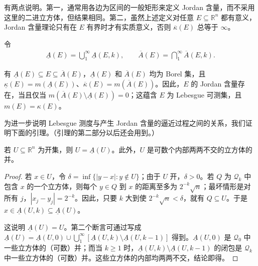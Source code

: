 \documentclass[../../main.tex]{subfiles}%
\begin{document}
\begin{remark}
有两点说明。第一，通常用各边为区间的一般矩形来定义 Jordan 含量，而不采用这里的二进立方体，但结果相同。第二，虽然上述定义对任意 $E\subseteq\mathbb{R}^n$ 都有意义，Jordan 含量理论只有在 $E$ 有界时才有实质意义，否则 $\overline{\kappa}(E)$ 总等于 $\infty$。
\end{remark}
令
\begin{align*}
\underline{A}(E)=\bigcup_1^\infty\underline{A}(E,k),\qquad
\overline{A}(E)=\bigcap_1^\infty\overline{A}(E,k).
\end{align*}
\begin{proposition}\label{proposition:ch02-jordan-lebesgue-criterion}
有 $\underline{A}(E)\subseteq E\subseteq\overline{A}(E)$，$\underline{A}(E)$ 和 $\overline{A}(E)$ 均为 Borel 集，且 $\underline{\kappa}(E)=m(\underline{A}(E))$、$\overline{\kappa}(E)=m(\overline{A}(E))$。因此，$E$ 的 Jordan 含量存在，当且仅当 $m(\overline{A}(E)\setminus\underline{A}(E))=0$；这蕴含 $E$ 为 Lebesgue 可测集，且 $m(E)=\kappa(E)$。
\end{proposition}
为进一步说明 Lebesgue 测度与产生 Jordan 含量的逼近过程之间的关系，我们证明下面的引理。（引理的第二部分以后还会用到。）
\begin{lemma}\label{lemma:ch02-open-cubes}
若 $U\subseteq\mathbb{R}^n$ 为开集，则 $U=\underline{A}(U)$。此外，$U$ 是可数个内部两两不交的立方体的并。
\end{lemma}
\begin{proof}
若 $x\in U$，令 $\delta=\inf\{|y-x|:y\notin U\}$；由于 $U$ 开，$\delta>0$。若 $Q$ 为 $\mathscr{Q}_k$ 中包含 $x$ 的一个立方体，则每个 $y\in Q$ 到 $x$ 的距离至多为 $2^{-k}\sqrt n$；最坏情形是对所有 $j$，$|x_j-y_j|=2^{-k}$。因此，只要 $k$ 大到使 $2^{-k}\sqrt n<\delta$，就有 $Q\subseteq U$。于是 $x\in\underline{A}(U,k)\subseteq\underline{A}(U)$。

这说明 $\underline{A}(U)=U$。第二个断言可通过写成 $\underline{A}(U)=\underline{A}(U,0)\cup\bigcup_1^\infty[\underline{A}(U,k)\setminus\underline{A}(U,k-1)]$ 得到。$\underline{A}(U,0)$ 是 $\mathscr{Q}_0$ 中一些立方体的（可数）并；而当 $k\ge1$ 时，$\underline{A}(U,k)\setminus\underline{A}(U,k-1)$ 的闭包是 $\mathscr{Q}_k$ 中一些立方体的（可数）并。这些立方体的内部均两两不交，结论即得。
\end{proof}
\end{document}
